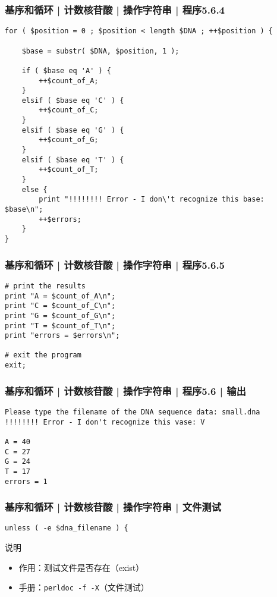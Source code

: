 \begin{frame}[fragile]
  \frametitle{基序和循环 | 计数核苷酸 | 操作字符串 | 程序5.6.4}
\begin{lstlisting}[firstnumber=45,basicstyle=\scriptsize\tt,numberstyle=\tiny]
for ( $position = 0 ; $position < length $DNA ; ++$position ) {

    $base = substr( $DNA, $position, 1 );

    if ( $base eq 'A' ) {
        ++$count_of_A;
    }
    elsif ( $base eq 'C' ) {
        ++$count_of_C;
    }
    elsif ( $base eq 'G' ) {
        ++$count_of_G;
    }
    elsif ( $base eq 'T' ) {
        ++$count_of_T;
    }
    else {
        print "!!!!!!!! Error - I don\'t recognize this base: $base\n";
        ++$errors;
    }
}
\end{lstlisting}
\end{frame}

\begin{frame}[fragile]
  \frametitle{基序和循环 | 计数核苷酸 | 操作字符串 | 程序5.6.5}
\begin{lstlisting}[firstnumber=67]
# print the results
print "A = $count_of_A\n";
print "C = $count_of_C\n";
print "G = $count_of_G\n";
print "T = $count_of_T\n";
print "errors = $errors\n";

# exit the program
exit;
\end{lstlisting}
\end{frame}

\begin{frame}[fragile]
  \frametitle{基序和循环 | 计数核苷酸 | 操作字符串 | 程序5.6 | 输出}
\begin{lstlisting}
Please type the filename of the DNA sequence data: small.dna
!!!!!!!! Error - I don't recognize this vase: V

A = 40
C = 27
G = 24
T = 17
errors = 1
\end{lstlisting}
\end{frame}

\begin{frame}[fragile]
  \frametitle{基序和循环 | 计数核苷酸 | 操作字符串 | \alert{文件测试}}
\begin{lstlisting}
unless ( -e $dna_filename ) {
\end{lstlisting}
\pause
\begin{block}{说明}
  \begin{itemize}
    \item 作用：测试文件是否存在（exist）
    \item 手册：\verb|perldoc -f -X|（文件测试）
  \end{itemize}
\end{block}
\end{frame}

